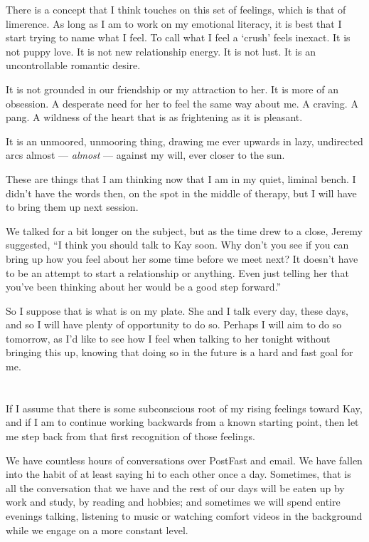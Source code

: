 There is a concept that I think touches on this set of feelings, which is that of limerence. As long as I am to work on my emotional literacy, it is best that I start trying to name what I feel. To call what I feel a `crush' feels inexact. It is not puppy love. It is not new relationship energy. It is not lust. It is an uncontrollable romantic desire.

It is not grounded in our friendship or my attraction to her. It is more of an obsession. A desperate need for her to feel the same way about me. A craving. A pang. A wildness of the heart that is as frightening as it is pleasant.

It is an unmoored, unmooring thing, drawing me ever upwards in lazy, undirected arcs almost --- \emph{almost} --- against my will, ever closer to the sun.

These are things that I am thinking now that I am in my quiet, liminal bench. I didn't have the words then, on the spot in the middle of therapy, but I will have to bring them up next session.

We talked for a bit longer on the subject, but as the time drew to a close, Jeremy suggested, ``I think you should talk to Kay soon. Why don't you see if you can bring up how you feel about her some time before we meet next? It doesn't have to be an attempt to start a relationship or anything. Even just telling her that you've been thinking about her would be a good step forward.''

So I suppose that is what is on my plate. She and I talk every day, these days, and so I will have plenty of opportunity to do so. Perhaps I will aim to do so tomorrow, as I'd like to see how I feel when talking to her tonight without bringing this up, knowing that doing so in the future is a hard and fast goal for me.

\section{}

If I assume that there is some subconscious root of my rising feelings toward Kay, and if I am to continue working backwards from a known starting point, then let me step back from that first recognition of those feelings.

We have countless hours of conversations over PostFast and email. We have fallen into the habit of at least saying hi to each other once a day. Sometimes, that is all the conversation that we have and the rest of our days will be eaten up by work and study, by reading and hobbies; and sometimes we will spend entire evenings talking, listening to music or watching comfort videos in the background while we engage on a more constant level.

